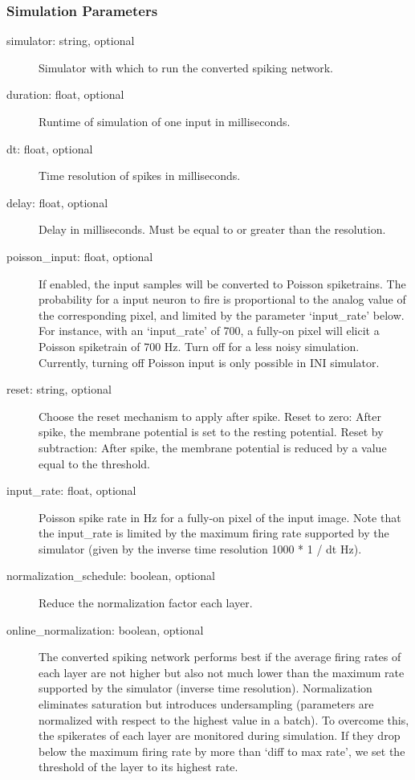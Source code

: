 \documentclass[letterpaper,10pt,english]{sphinxmanual}
\begin{document}
\subsubsection{Simulation Parameters}
\label{configure_toolbox:simulation-parameters}\begin{description}
\item[{simulator: string, optional}] \leavevmode
Simulator with which to run the converted spiking network.

\item[{duration: float, optional}] \leavevmode
Runtime of simulation of one input in milliseconds.

\item[{dt: float, optional}] \leavevmode
Time resolution of spikes in milliseconds.

\item[{delay: float, optional}] \leavevmode
Delay in milliseconds. Must be equal to or greater than the resolution.

\item[{poisson\_input: float, optional}] \leavevmode
If enabled, the input samples will be converted to Poisson spiketrains. The
probability for a input neuron to fire is proportional to the analog value
of the corresponding pixel, and limited by the parameter `input\_rate'
below. For instance, with an `input\_rate' of 700, a fully-on pixel will
elicit a Poisson spiketrain of 700 Hz. Turn off for a less noisy
simulation. Currently, turning off Poisson input is only possible in INI
simulator.

\item[{reset: string, optional}] \leavevmode
Choose the reset mechanism to apply after spike.
Reset to zero: After spike, the membrane potential is set to the resting
potential.
Reset by subtraction: After spike, the membrane potential is reduced by a
value equal to the threshold.

\item[{input\_rate: float, optional}] \leavevmode
Poisson spike rate in Hz for a fully-on pixel of the input image. Note that
the input\_rate is limited by the maximum firing rate supported by the
simulator (given by the inverse time resolution 1000 * 1 / dt Hz).

\item[{normalization\_schedule: boolean, optional}] \leavevmode
Reduce the normalization factor each layer.

\item[{online\_normalization: boolean, optional}] \leavevmode
The converted spiking network performs best if the average firing rates of
each layer are not higher but also not much lower than the maximum rate
supported by the simulator (inverse time resolution). Normalization
eliminates saturation but introduces undersampling (parameters are
normalized with respect to the highest value in a batch). To overcome this,
the spikerates of each layer are monitored during simulation. If they drop
below the maximum firing rate by more than `diff to max rate', we set the
threshold of the layer to its highest rate.


\end{description}
\end{document}
